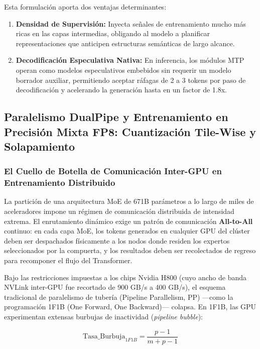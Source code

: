 Esta formulación aporta dos ventajas determinantes:
\begin{enumerate}
    \item \textbf{Densidad de Supervisión:} Inyecta señales de entrenamiento mucho más ricas en las capas intermedias, obligando al modelo a planificar representaciones que anticipen estructuras semánticas de largo alcance.
    \item \textbf{Decodificación Especulativa Nativa:} En inferencia, los módulos MTP operan como modelos especulativos embebidos sin requerir un modelo borrador auxiliar, permitiendo aceptar ráfagas de 2 a 3 tokens por paso de decodificación y acelerando la generación hasta en un factor de 1.8x.
\end{enumerate}

\vspace{0.4cm}

\subsection{Paralelismo DualPipe y Entrenamiento en Precisión Mixta FP8: Cuantización Tile-Wise y Solapamiento}

\subsubsection{El Cuello de Botella de Comunicación Inter-GPU en Entrenamiento Distribuido}

La partición de una arquitectura MoE de 671B parámetros a lo largo de miles de aceleradores impone un régimen de comunicación distribuida de intensidad extrema. El enrutamiento dinámico exige un patrón de comunicación \textbf{All-to-All} continuo: en cada capa MoE, los tokens generados en cualquier GPU del clúster deben ser despachados físicamente a los nodos donde residen los expertos seleccionados por la compuerta, y los resultados deben ser recolectados de regreso para recomponer el flujo del Transformer.

Bajo las restricciones impuestas a los chips Nvidia H800 (cuyo ancho de banda NVLink inter-GPU fue recortado de 900 GB/s a 400 GB/s), el esquema tradicional de paralelismo de tubería (Pipeline Parallelism, PP) ---como la programación 1F1B (One Forward, One Backward)--- colapsa. En 1F1B, las GPU experimentan extensas burbujas de inactividad (\textit{pipeline bubble}):

\begin{equation}
\mathrm{Tasa\_Burbuja}_{1F1B} = \frac{p - 1}{m + p - 1}
\end{equation}

